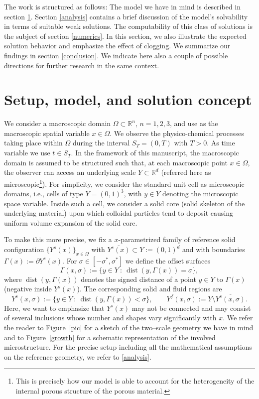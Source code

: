 \documentclass[reqno, 11pt]{amsart}
\numberwithin{equation}{section}
\newcommand{\dist}{\operatorname{dist}}
\begin{document}
The work is structured as follows: The model we have in mind is described in section \ref{PuwS}. Section \ref{analysis} contains a brief discussion of the model's solvability in terms of suitable weak solutions.  The computability of this class of solutions is the subject of section \ref{numerics}. In this section, we also illustrate the expected solution behavior and emphasize the effect of clogging. We summarize our findings in section \ref{conclusion}. We indicate here also a couple of possible directions for further research in the same context. 



\section{Setup, model, and solution concept}\label{PuwS}

We consider a macroscopic domain $\Omega\subset \mathbb{R}^n$, $n=1,2,3$, and use as the macroscopic spatial variable $x\in\Omega$.
We observe the physico-chemical processes taking place within $\Omega$ during the interval $S_T=(0,T)$ with $T>0$.
As time variable we use $t\in S_T$. 
In the framework of this manuscript, the macroscopic domain is assumed to be structured such that, at each macroscopic point $x\in \Omega$, the observer can access an underlying scale $Y\subset \mathbb{R}^d$ (referred here as microscopic\footnote{This is precisely how our model is able to account for the heterogeneity of the internal porous structure of the porous material.}).
For simplicity, we consider the standard unit cell as microscopic domains, i.e., cells of type $Y=(0,1)^3$, with $y\in Y$ denoting the microscopic space variable.
Inside such a cell, we consider a solid core (solid skeleton of the underlying material) upon which colloidal particles tend to deposit causing uniform volume expansion of the solid core.

To make this more precise, we fix a $x$-parametrized family of reference solid configuration $\{Y^s(x)\}_{x\in\Omega}$ with $\overline{Y^s(x)}\subset Y:=(0,1)^d$ and with boundaries $\Gamma(x):=\partial Y^s(x)$.
For $\sigma\in[-\sigma^*,\sigma^*]$ we define the offset surfaces
\[
\Gamma(x,\sigma):=\{y\in Y\ :\ \dist(y,\Gamma(x))=\sigma\},
\]
where $\dist(y,\Gamma(x))$ denotes the signed distance of a point $y\in Y$ to $\Gamma(x)$ (negative inside $Y^s(x)$).
The corresponding solid and fluid regions are
\[
Y^s(x,\sigma):=\{y\in Y\ :\ \dist(y,\Gamma(x))<\sigma\},
\qquad
Y^f(x,\sigma):=Y\setminus\overline{Y^s(x,\sigma)}.
\]
%
Here, we want to emphasize that $Y^s(x)$ may not be connected and may consist of several inclusions whose number and shapes vary significantly with $x$.
We refer the reader to Figure~\ref{pic} for a sketch of the two–scale geometry we have in mind and to Figure~\ref{growth} for a schematic representation of the involved microstructure.
For the precise setup including all the mathematical assumptions on the reference geometry, we refer to \cref{analysis}.
\end{document}
